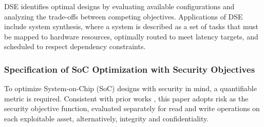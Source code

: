 DSE identifies optimal designs by evaluating available configurations and analyzing the trade-offs between competing objectives. Applications of DSE include system synthesis, where a system is described as a set of tasks that must be mapped to hardware resources, optimally routed to meet latency targets, and scheduled to respect dependency constraints.



\subsubsection{Specification of SoC Optimization with Security Objectives}




To optimize System-on-Chip (SoC) designs with security in mind, a quantifiable metric is required. Consistent with prior works \cite{saha_metrics_2022, butka_measuring_2025}, this paper adopts risk as the security objective function, evaluated separately for read and write operations on each exploitable asset, alternatively, integrity and confidentiality.

